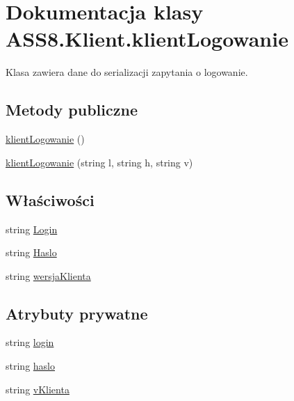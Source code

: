 \hypertarget{a00009}{
\section{Dokumentacja klasy ASS8.Klient.klientLogowanie}
\label{da/da0/a00009}
}
Klasa zawiera dane do serializacji zapytania o logowanie.  


\subsection*{Metody publiczne}
\begin{CompactItemize}
\item 
\hyperlink{a00009_35b35cead7d9f58a9c114ca328012f32}{klientLogowanie} ()
\item 
\hyperlink{a00009_be81e6b3b3e980fc92672d677ee97602}{klientLogowanie} (string l, string h, string v)
\end{CompactItemize}
\subsection*{Właściwości}
\begin{CompactItemize}
\item 
string \hyperlink{a00009_bf20831d9b7c79f4c9de90320ff7e250}{Login}
\item 
string \hyperlink{a00009_6f3c62f8e9b616f4b214788974fe93cd}{Haslo}
\item 
string \hyperlink{a00009_aa3348ed5721633094699e4ab4b43289}{wersjaKlienta}
\end{CompactItemize}
\subsection*{Atrybuty prywatne}
\begin{CompactItemize}
\item 
string \hyperlink{a00009_1fa00149f1a375887302be1b66d76f51}{login}
\item 
string \hyperlink{a00009_ee8fc634a45d3b1c48c0fda5de62aa8b}{haslo}
\item 
string \hyperlink{a00009_4f1ccf1f388e4f7c412a91ceefd11cc8}{vKlienta}
\end{CompactItemize}


